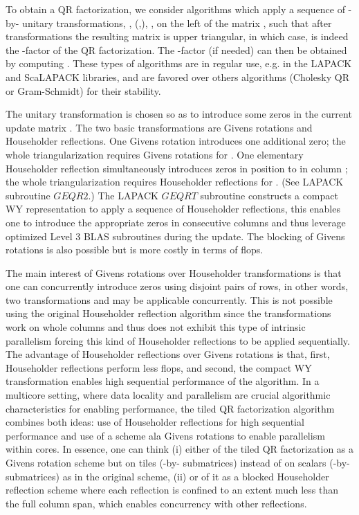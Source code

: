 \documentclass[a4paper,twopages]{article}
\newcommand{\GEQRTWO}{\ensuremath{\mathit{GEQR2}}\xspace}
\newcommand{\GEQRT}{\ensuremath{\mathit{GEQRT}}\xspace}
\begin{document}
To obtain a QR factorization, we consider algorithms which apply a
sequence of -by- unitary transformations, , (,),
, on the left of the matrix , such that after 
transformations the resulting matrix  is upper
triangular, in which case,  is indeed the -factor of the QR factorization.
The -factor (if needed) can then be obtained by computing .  These types of algorithms are in regular use, e.g. in the
LAPACK and ScaLAPACK libraries, and are favored over others algorithms (Cholesky
QR or Gram-Schmidt) for their stability.

The unitary transformation  is chosen so as to introduce some zeros in the
current update matrix . The two basic transformations
are Givens rotations and Householder reflections.  One Givens rotation
introduces one additional zero; the whole triangularization requires  Givens rotations for . One elementary Householder reflection
simultaneously introduces  zeros in position  to  in column ;
the whole triangularization requires  Householder reflections for .
(See LAPACK subroutine \GEQRTWO.) The LAPACK \GEQRT subroutine constructs a
compact WY representation to apply a sequence of  Householder reflections,
this enables one to introduce the appropriate zeros in  consecutive columns
and thus leverage optimized Level 3 BLAS subroutines during the update. The
blocking of Givens rotations is also possible but is more costly in terms of
flops.

The main interest of Givens rotations over Householder transformations is that
one can concurrently introduce zeros using disjoint pairs of rows, in other
words, two transformations  and  may be applicable concurrently.
This is not possible using the original Householder reflection algorithm since
the transformations work on whole columns and thus does not exhibit this type
of intrinsic parallelism forcing this kind of Householder reflections to be
applied sequentially. The advantage of Householder reflections over Givens
rotations is that, first, Householder reflections perform less flops, and second,
the compact WY transformation enables high sequential performance of the
algorithm. In a multicore setting, where data locality and parallelism are
crucial algorithmic characteristics for enabling performance, the tiled QR
factorization algorithm combines both ideas: use of Householder reflections for
high sequential performance and use of a scheme ala Givens rotations to enable
parallelism within cores. In essence, one can think (i) either of the tiled QR
factorization as a Givens rotation scheme but on tiles (-by-
submatrices) instead of on scalars (-by- submatrices) as in the original
scheme, (ii) or of it as a blocked Householder reflection scheme
where each reflection is confined to an extent much less than the full column
span, which enables concurrency with other reflections.
\end{document}
